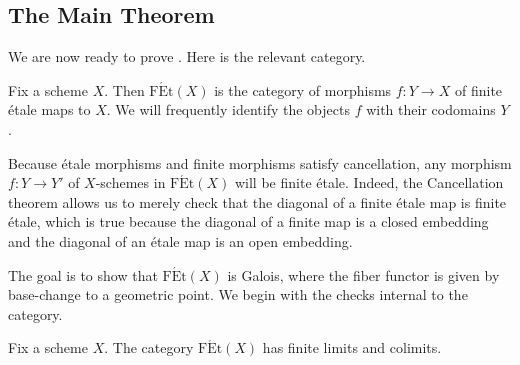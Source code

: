 \documentclass{amsart}
\begin{document}
\subsection{The Main Theorem} \label{subsec:main-thm}
We are now ready to prove . Here is the relevant category.
\begin{definition}
    Fix a scheme $X$. Then $\mathrm{F\acute Et}(X)$ is the category of morphisms $f\colon Y\to X$ of finite \'etale maps to $X$. We will frequently identify the objects $f$ with their codomains $Y$.
\end{definition}
\begin{remark}
    Because \'etale morphisms and finite morphisms satisfy cancellation, any morphism $f\colon Y\to Y'$ of $X$-schemes in $\mathrm{F\acute Et}(X)$ will be finite \'etale. Indeed, the Cancellation theorem \cite[Theorem~11.2.1]{rising-sea} allows us to merely check that the diagonal of a finite \'etale map is finite \'etale, which is true because the diagonal of a finite map is a closed embedding and the diagonal of an \'etale map is an open embedding.
\end{remark}
The goal is to show that $\mathrm{F\acute Et}(X)$ is Galois, where the fiber functor is given by base-change to a geometric point. We begin with the checks internal to the category.
\begin{proposition} \label{prop:fet-limits-colimits}
    Fix a scheme $X$. The category $\mathrm{F\acute Et}(X)$ has finite limits and colimits.
\end{proposition}
\end{document}
